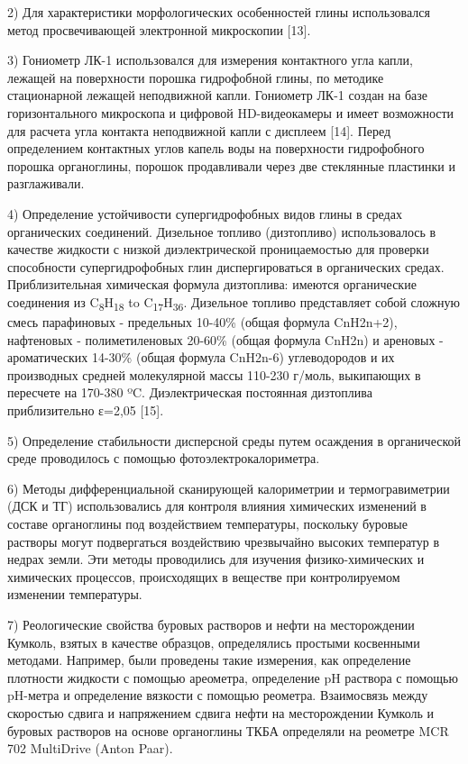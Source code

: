 \begin{multicols}{2}
2) Для характеристики морфологических особенностей глины использовался
метод просвечивающей электронной микроскопии {[}13{]}.

3) Гониометр ЛК-1 использовался для измерения контактного угла капли,
лежащей на поверхности порошка гидрофобной глины, по методике
стационарной лежащей неподвижной капли. Гониометр ЛК-1 создан на базе
горизонтального микроскопа и цифровой HD-видеокамеры и имеет возможности
для расчета угла контакта неподвижной капли с дисплеем {[}14{]}. Перед
определением контактных углов капель воды на поверхности гидрофобного
порошка органоглины, порошок продавливали через две стеклянные пластинки
и разглаживали.

4) Определение устойчивости супергидрофобных видов глины в средах
органических соединений. Дизельное топливо (дизтопливо) использовалось в
качестве жидкости с низкой диэлектрической проницаемостью для проверки
способности супергидрофобных глин диспергироваться в органических
средах. Приблизительная химическая формула дизтоплива: имеются
органические соединения из C\textsubscript{8}H\textsubscript{18} to
C\textsubscript{17}H\textsubscript{36}. Дизельное топливо представляет
собой сложную смесь парафиновых - предельных 10-40\% (общая формула
CnH2n+2), нафтеновых - полиметиленовых 20-60\% (общая формула CnH2n) и
ареновых - ароматических 14-30\% (общая формула CnH2n-6) углеводородов и
их производных средней молекулярной массы 110-230 г/моль, выкипающих в
пересчете на 170-380 ºC. Диэлектрическая постоянная дизтоплива
приблизительно ε=2,05 {[}15{]}.

5) Определение стабильности дисперсной среды путем осаждения в
органической среде проводилось с помощью фотоэлектрокалориметра.

6) Методы дифференциальной сканирующей калориметрии и термогравиметрии
(ДСК и ТГ) использовались для контроля влияния химических изменений в
составе органоглины под воздействием температуры, поскольку буровые
растворы могут подвергаться воздействию чрезвычайно высоких температур в
недрах земли. Эти методы проводились для изучения физико-химических и
химических процессов, происходящих в веществе при контролируемом
изменении температуры.

7) Реологические свойства буровых растворов и нефти на месторождении
Кумколь, взятых в качестве образцов, определялись простыми косвенными
методами. Например, были проведены такие измерения, как определение
плотности жидкости с помощью ареометра, определение pH раствора с
помощью pH-метра и определение вязкости с помощью реометра. Взаимосвязь
между скоростью сдвига и напряжением сдвига нефти на месторождении
Кумколь и буровых растворов на основе органоглины ТКБА определяли на
реометре MCR 702 MultiDrive (Anton Paar).


\end{multicols}
